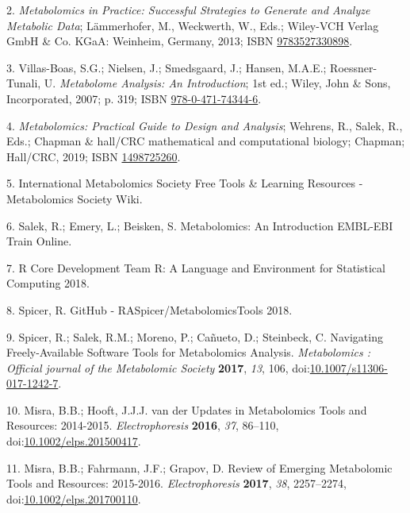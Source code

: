\documentclass[]{article}
\begin{document}
\leavevmode\hypertarget{ref-lammerhofer_2013}{}%
2. \emph{Metabolomics in Practice: Successful Strategies to Generate and Analyze Metabolic Data}; Lämmerhofer, M., Weckwerth, W., Eds.; Wiley-VCH Verlag GmbH \& Co. KGaA: Weinheim, Germany, 2013; ISBN \href{https://worldcat.org/isbn/9783527330898}{9783527330898}.

\leavevmode\hypertarget{ref-villasboas_2007}{}%
3. Villas-Boas, S.G.; Nielsen, J.; Smedsgaard, J.; Hansen, M.A.E.; Roessner-Tunali, U. \emph{Metabolome Analysis: An Introduction}; 1st ed.; Wiley, John \& Sons, Incorporated, 2007; p. 319; ISBN \href{https://worldcat.org/isbn/978-0-471-74344-6}{978-0-471-74344-6}.

\leavevmode\hypertarget{ref-wehrens_2019}{}%
4. \emph{Metabolomics: Practical Guide to Design and Analysis}; Wehrens, R., Salek, R., Eds.; Chapman \& hall/CRC mathematical and computational biology; Chapman; Hall/CRC, 2019; ISBN \href{https://worldcat.org/isbn/1498725260}{1498725260}.

\leavevmode\hypertarget{ref-InternationalMetabolomicsSociety_2019}{}%
5. International Metabolomics Society Free Tools \& Learning Resources - Metabolomics Society Wiki.

\leavevmode\hypertarget{ref-salek_website_nd}{}%
6. Salek, R.; Emery, L.; Beisken, S. Metabolomics: An Introduction EMBL-EBI Train Online.

\leavevmode\hypertarget{ref-rcoredevelopmentteam_website_2018}{}%
7. R Core Development Team R: A Language and Environment for Statistical Computing 2018.

\leavevmode\hypertarget{ref-spicer_website_2018}{}%
8. Spicer, R. GitHub - RASpicer/MetabolomicsTools 2018.

\leavevmode\hypertarget{ref-spicer_2017}{}%
9. Spicer, R.; Salek, R.M.; Moreno, P.; Cañueto, D.; Steinbeck, C. Navigating Freely-Available Software Tools for Metabolomics Analysis. \emph{Metabolomics : Official journal of the Metabolomic Society} \textbf{2017}, \emph{13}, 106, doi:\href{https://doi.org/10.1007/s11306-017-1242-7}{10.1007/s11306-017-1242-7}.

\leavevmode\hypertarget{ref-misra_2016}{}%
10. Misra, B.B.; Hooft, J.J.J. van der Updates in Metabolomics Tools and Resources: 2014-2015. \emph{Electrophoresis} \textbf{2016}, \emph{37}, 86--110, doi:\href{https://doi.org/10.1002/elps.201500417}{10.1002/elps.201500417}.

\leavevmode\hypertarget{ref-misra_2017}{}%
11. Misra, B.B.; Fahrmann, J.F.; Grapov, D. Review of Emerging Metabolomic Tools and Resources: 2015-2016. \emph{Electrophoresis} \textbf{2017}, \emph{38}, 2257--2274, doi:\href{https://doi.org/10.1002/elps.201700110}{10.1002/elps.201700110}.
\end{document}
